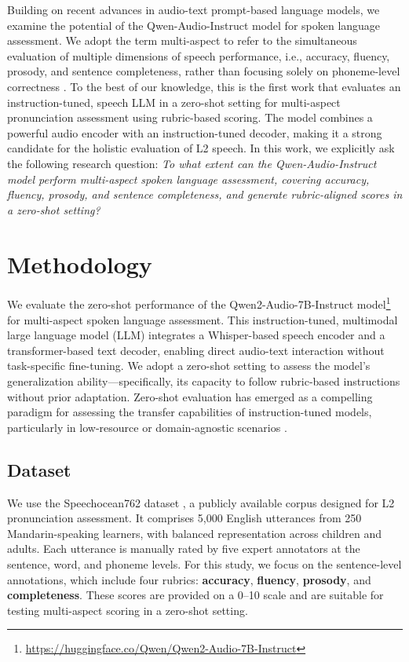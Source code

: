 \documentclass{Interspeech}
\begin{document}
Building on recent advances in audio-text prompt-based language models, we examine the potential of the Qwen-Audio-Instruct model for spoken language assessment. We adopt the term multi-aspect to refer to the simultaneous evaluation of multiple dimensions of speech performance, i.e., accuracy, fluency, prosody, and sentence completeness, rather than focusing solely on phoneme-level correctness \cite{9746743}.  To the best of our knowledge, this is the first work that evaluates an instruction-tuned, speech LLM in a zero-shot setting for multi-aspect pronunciation assessment using rubric-based scoring. The model combines a powerful audio encoder with an instruction-tuned decoder, making it a strong candidate for the holistic evaluation of L2 speech. In this work, we explicitly ask the following research question: \textit{To what extent can the Qwen-Audio-Instruct model perform multi-aspect spoken language assessment, covering accuracy, fluency, prosody, and sentence completeness, and generate rubric-aligned scores in a zero-shot setting?}

\section{Methodology}

We evaluate the zero-shot performance of the Qwen2-Audio-7B-Instruct model\footnote{\tiny\url{https://huggingface.co/Qwen/Qwen2-Audio-7B-Instruct}} for multi-aspect spoken language assessment. This instruction-tuned, multimodal large language model (LLM) integrates a Whisper-based speech encoder and a transformer-based text decoder, enabling direct audio-text interaction without task-specific fine-tuning. We adopt a zero-shot setting to assess the model's generalization ability—specifically, its capacity to follow rubric-based instructions without prior adaptation. Zero-shot evaluation has emerged as a compelling paradigm for assessing the transfer capabilities of instruction-tuned models, particularly in low-resource or domain-agnostic scenarios \cite{wei2022emergent, sun2023evaluating}.

\subsection{Dataset}

We use the Speechocean762 dataset \cite{zhang2021speechocean762}, a publicly available corpus designed for L2 pronunciation assessment. It comprises 5,000 English utterances from 250 Mandarin-speaking learners, with balanced representation across children and adults. Each utterance is manually rated by five expert annotators at the sentence, word, and phoneme levels. For this study, we focus on the sentence-level annotations, which include four rubrics: \textbf{accuracy}, \textbf{fluency}, \textbf{prosody}, and \textbf{completeness}. These scores are provided on a 0–10 scale and are suitable for testing multi-aspect scoring in a zero-shot setting.
\end{document}
